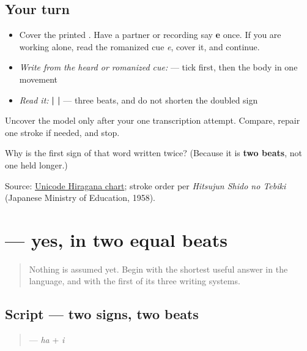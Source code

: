 \subsection*{Your turn}
\begin{itemize}
\raggedright
  \item Cover the printed \textbf{}. Have a partner or recording say \textbf{e} once. If you are working alone, read the romanized cue \emph{e}, cover it, and continue.
  \item \emph{Write from the heard or romanized cue:}  — tick first, then the body in one movement
  \item \emph{Read it:} \textbf{ |  | } — three beats, and do not shorten the doubled sign
\end{itemize}

Uncover the model only after your one transcription attempt. Compare, repair one stroke if needed, and stop.

\begin{tcolorbox}[breakable,colback=teal!4,colframe=teal!35!black,title={Before you move on}]
Why is the first sign of that word written twice? (Because it is \textbf{two beats}, not one held longer.)

Source: \href{https://www.unicode.org/charts/PDF/U3040.pdf}{Unicode Hiragana chart}; stroke order per \emph{Hitsujun Shido no Tebiki} (Japanese Ministry of Education, 1958).
\end{tcolorbox}
\section[\texorpdfstring{\ja{はい} (hai)}{はい (hai)}]{ — yes, in two equal beats}

\label{lesson:JA-C01-hai}



\begin{quote}
Nothing is assumed yet. Begin with the shortest useful answer in the language, and with the first of its three writing systems.
\end{quote}

\subsection*{Script — two signs, two beats}
\begin{quote}
\textbf{} — \textbf{} \emph{ha} + \textbf{} \emph{i}
\end{quote}

